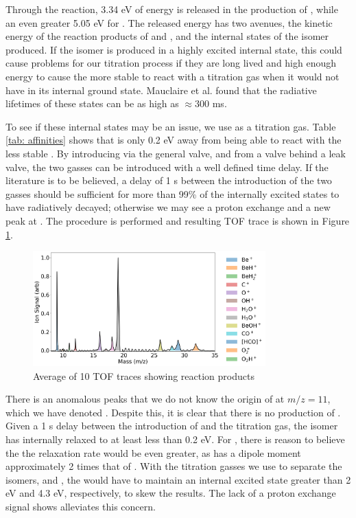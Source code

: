 Through the  reaction, 3.34 eV of energy is released in the production of , while an even greater 5.05 eV for . The released energy has two avenues, the kinetic energy of the reaction products of \ce{[HCO]+} and , and the internal states of the isomer produced. If the isomer is produced in a highly excited internal state, this could cause problems for our titration process if they are long lived and high enough energy to cause the more stable  to react with a titration gas  when it would not have in its internal ground state. Mauclaire et al. found that the radiative lifetimes of these states can be as high as $\approx 300$ ms.\cite{Mauclaire1995}

To see if these internal states may be an issue, we use  as a titration gas. Table \ref{tab: affinities} shows that  is only 0.2 eV away from being able to react with the less stable . By introducing  via the general valve, and  from a valve behind a leak valve, the two gasses can be introduced with a well defined time delay. If the literature is to be believed, a delay of 1 s between the introduction of the two gasses should be sufficient for more than 99\% of the internally excited states to have radiatively decayed; otherwise we may see a proton exchange and a new peak at . The procedure is performed and resulting TOF trace is shown in Figure \ref{fig: O2 titration}.

\begin{figure}
	\centering
	\includegraphics[width=0.8\textwidth]{images/O2_titration.png}
	\caption{Average of 10 TOF traces showing reaction products}
	\label{fig: O2 titration}
\end{figure}

There is an anomalous peaks that we do not know the origin of at $m/z=11$, which we have denoted . Despite this, it is clear that there is no production of . Given a 1 s delay between the introduction of  and the titration gas, the  isomer has internally relaxed to at least less than 0.2 eV. For , there is reason to believe the the relaxation rate would be even greater, as  has a dipole moment approximately 2 times that of .\cite{Rogers1982} With the titration gasses we use to separate the isomers,  and , the  would have to maintain an internal excited state greater than 2 eV and 4.3 eV, respectively, to skew the results. The lack of a proton exchange signal shows alleviates this concern.